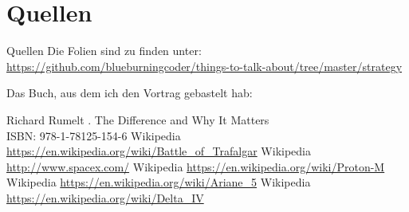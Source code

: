 \section{Quellen}
\begin{frame}{Quellen}
    Die Folien sind zu finden unter: \\
    \url{https://github.com/blueburningcoder/things-to-talk-about/tree/master/strategy}


    Das Buch, aus dem ich den Vortrag gebastelt hab:

    \begin{thebibliography}{10}
    \beamertemplatebookbibitems
        Richard Rumelt
        .
        \newblock The Difference and Why It Matters \\
                  ISBN: 978-1-78125-154-6
    \beamertemplatearticlebibitems
        Wikipedia
            \newblock \url{https://en.wikipedia.org/wiki/Battle\_of\_Trafalgar}
        Wikipedia
            \newblock \url{http://www.spacex.com/}
        Wikipedia
            \newblock \url{https://en.wikipedia.org/wiki/Proton-M}
        Wikipedia
            \newblock \url{https://en.wikipedia.org/wiki/Ariane\_5}
        Wikipedia
            \newblock \url{https://en.wikipedia.org/wiki/Delta\_IV}
    \end{thebibliography}

\end{frame}


